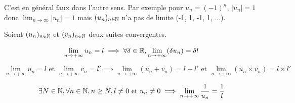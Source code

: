 \documentclass[a4paper, 12pt]{article}
\begin{document}
\begin{remark}
    C'est en général faux dans l'autre sens. Par exemple pour $u_n = (-1)^n$,
    $|u_n|=1$ donc $\lim_{n \to \infty} |u_n| = 1$ mais $(u_n)_{n \in \mathbb{N}}$ n'a pas de limite (-1, 1, -1, 1, ...).
\end{remark}

\begin{proposition}
    Soient $(u_n)_{n \in \mathbb{N}}$ et $(v_n)_{n \in \mathbb{N}}$ deux suites convergentes.

    \item
    $$
    \lim_{n \to +\infty} u_n = l \implies \forall \delta \in \mathbb{R}, \lim_{n \to +\infty}(\delta u_n) = \delta l
    $$
    
    \item
    $$
    \lim_{n \to +\infty} u_n = l \text{ et } \lim_{n \to +\infty} v_n = l' \implies \lim_{n \to +\infty}(u_n + v_n) = l + l' \text{ et } \lim_{n \to +\infty}(u_n \times v_n) = l \times l'
    $$
    
    \item
    $$
    \exists N \in \mathbb{N}, \forall n \in \mathbb{N}, n \geq N, l \neq 0 \text{ et } u_n \neq 0 \implies \lim_{n \to +\infty} \dfrac{1}{u_n}=\dfrac{1}{l}
    $$
\end{proposition}
\end{document}
